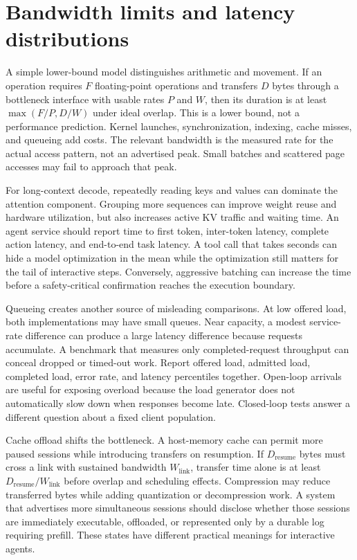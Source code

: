 \section{Bandwidth limits and latency distributions}
\label{sec:C04:bandwidth}
A simple lower-bound model distinguishes arithmetic and movement. If an operation requires $F$ floating-point operations and transfers $D$ bytes through a bottleneck interface with usable rates $P$ and $W$, then its duration is at least $\max(F/P,D/W)$ under ideal overlap. This is a lower bound, not a performance prediction. Kernel launches, synchronization, indexing, cache misses, and queueing add costs. The relevant bandwidth is the measured rate for the actual access pattern, not an advertised peak. Small batches and scattered page accesses may fail to approach that peak.

For long-context decode, repeatedly reading keys and values can dominate the attention component. Grouping more sequences can improve weight reuse and hardware utilization, but also increases active KV traffic and waiting time. An agent service should report time to first token, inter-token latency, complete action latency, and end-to-end task latency. A tool call that takes seconds can hide a model optimization in the mean while the optimization still matters for the tail of interactive steps. Conversely, aggressive batching can increase the time before a safety-critical confirmation reaches the execution boundary.

Queueing creates another source of misleading comparisons. At low offered load, both implementations may have small queues. Near capacity, a modest service-rate difference can produce a large latency difference because requests accumulate. A benchmark that measures only completed-request throughput can conceal dropped or timed-out work. Report offered load, admitted load, completed load, error rate, and latency percentiles together. Open-loop arrivals are useful for exposing overload because the load generator does not automatically slow down when responses become late. Closed-loop tests answer a different question about a fixed client population.

Cache offload shifts the bottleneck. A host-memory cache can permit more paused sessions while introducing transfers on resumption. If $D_{\mathrm{resume}}$ bytes must cross a link with sustained bandwidth $W_{\mathrm{link}}$, transfer time alone is at least $D_{\mathrm{resume}}/W_{\mathrm{link}}$ before overlap and scheduling effects. Compression may reduce transferred bytes while adding quantization or decompression work. A system that advertises more simultaneous sessions should disclose whether those sessions are immediately executable, offloaded, or represented only by a durable log requiring prefill. These states have different practical meanings for interactive agents.

